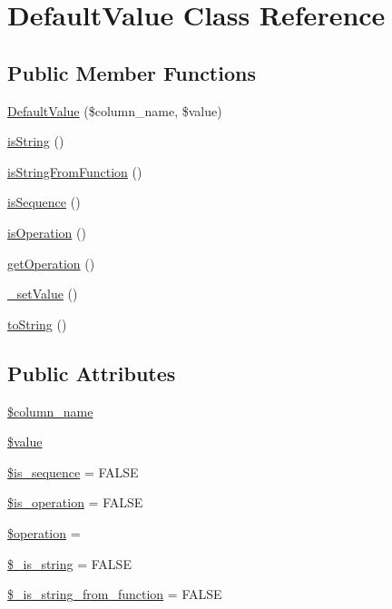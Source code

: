 \hypertarget{classDefaultValue}{}\section{Default\+Value Class Reference}
\label{classDefaultValue}
\subsection*{Public Member Functions}
\begin{DoxyCompactItemize}
\item 
\hyperlink{classDefaultValue_a738994d0f9563b86310d85ede30c2fc7}{Default\+Value} (\$column\+\_\+name, \$value)
\item 
\hyperlink{classDefaultValue_a2ff17e887cf955aea26fbb1b3e11f491}{is\+String} ()
\item 
\hyperlink{classDefaultValue_aeef8c65be1e3cfe7459916653d6d9181}{is\+String\+From\+Function} ()
\item 
\hyperlink{classDefaultValue_a5186ba40cadb8a1740edd64665f4c126}{is\+Sequence} ()
\item 
\hyperlink{classDefaultValue_af7a051370a3b8bb17d9f9cf64a03be74}{is\+Operation} ()
\item 
\hyperlink{classDefaultValue_a1e607abe2e29a00fa3ab0cecba406776}{get\+Operation} ()
\item 
\hyperlink{classDefaultValue_a1a0d50d43f32dbb3df7e11467c6938be}{\+\_\+set\+Value} ()
\item 
\hyperlink{classDefaultValue_a0f0d4d1cc64b3bfb8d2acec2b113be4d}{to\+String} ()
\end{DoxyCompactItemize}
\subsection*{Public Attributes}
\begin{DoxyCompactItemize}
\item 
\hyperlink{classDefaultValue_a671e32e797e9975b6497a56a5ba92dc6}{\$column\+\_\+name}
\item 
\hyperlink{classDefaultValue_a963ea764e6dfb5dbfe87c4b8ffd131ac}{\$value}
\item 
\hyperlink{classDefaultValue_a7ad2c3e04c79053b6299c0fa0e35389e}{\$is\+\_\+sequence} = F\+A\+L\+S\+E
\item 
\hyperlink{classDefaultValue_ae01855465814b8be26de7bd0b33b6778}{\$is\+\_\+operation} = F\+A\+L\+S\+E
\item 
\hyperlink{classDefaultValue_a0b0e52103637bbb5ea0fdedcb0672fcd}{\$operation} = \textquotesingle{}\textquotesingle{}
\item 
\hyperlink{classDefaultValue_ac3b23483d015be5b48517fb96890b64a}{\$\+\_\+is\+\_\+string} = F\+A\+L\+S\+E
\item 
\hyperlink{classDefaultValue_a000cf284b962d5c3354abd73b611c888}{\$\+\_\+is\+\_\+string\+\_\+from\+\_\+function} = F\+A\+L\+S\+E
\end{DoxyCompactItemize}


